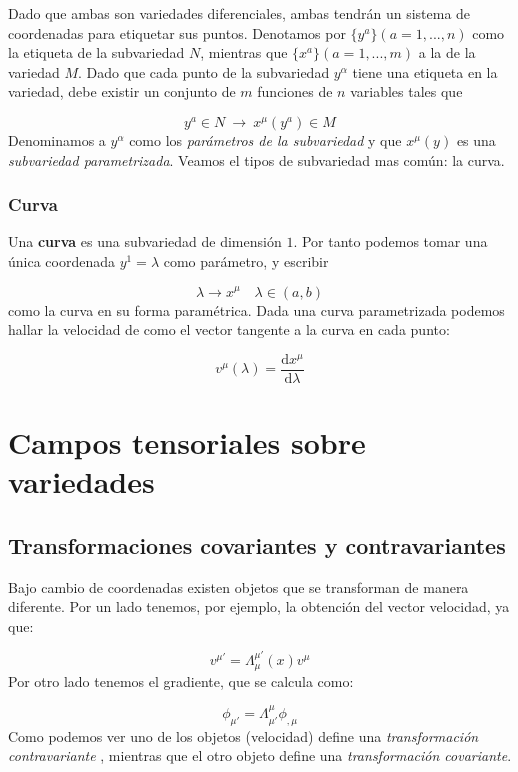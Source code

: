 \documentclass[12pt,a4paper]{book}
\numberwithin{equation}{section}
\numberwithin{figure}{section}
\newcommand{\D}{\mathrm{d}}
\newcommand{\derivadas}[2]{\frac{\D #1}{\D #2}}
\begin{document}
Dado que ambas son variedades diferenciales, ambas tendrán un sistema de coordenadas para etiquetar sus puntos. Denotamos por $\{ y^a \} (a=1,...,n)$ como la etiqueta de la subvariedad $N$, mientras que  $\{ x^a \} (a=1,...,m)$ a la de la variedad $M$. Dado que cada punto de la subvariedad $y^{\alpha}$ tiene una etiqueta en la variedad, debe existir un conjunto de $m$ funciones de $n$ variables tales que

\begin{equation}
y^a \in N  \ \longrightarrow \ x^{\mu}(y^a) \in M
\end{equation}
Denominamos a $y^{\alpha}$ como los \textit{parámetros de la subvariedad} y que $x^{\mu}(y)$ es una \textit{subvariedad parametrizada}. Veamos el tipos de subvariedad mas común: la curva. 

\subsubsection{Curva}
Una \textbf{curva} es una subvariedad de dimensión $1$. Por tanto podemos tomar una única coordenada $y^1 = \lambda$ como parámetro, y escribir 

\begin{equation}
\lambda \rightarrow x^{\mu} \quad \lambda \in (a,b)
\end{equation}
como la curva en su forma paramétrica. Dada una curva parametrizada podemos hallar la velocidad de como el vector tangente a la curva en cada punto:

\begin{equation}
v^{\mu} (\lambda ) = \derivadas{x^{\mu}}{\lambda}
\end{equation}

\section{Campos tensoriales sobre variedades}
\subsection{Transformaciones covariantes y contravariantes}

Bajo cambio de coordenadas existen objetos que se transforman de manera diferente. Por un lado tenemos, por ejemplo, la obtención del vector velocidad, ya que:

$$ v^{\mu'} = \Lambda^{\mu'}_{\mu} (x) v^{\mu} $$
Por otro lado tenemos el gradiente, que se calcula como:

\begin{equation}
\phi_{\mu'} = \Lambda^{\mu}_{\mu'} \phi_{,\mu}
\end{equation} 
Como podemos ver uno de los objetos (velocidad) define una \textit{transformación contravariante} , mientras que el otro objeto define una \textit{transformación covariante}. \\
\end{document}
